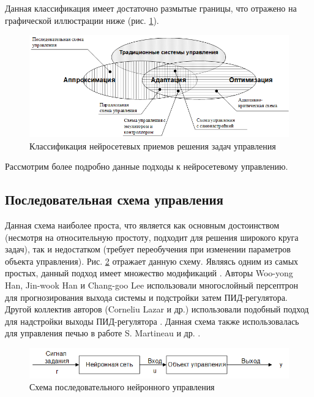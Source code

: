 Данная классификация имеет достаточно размытые границы, что отражено на графической иллюстрации ниже (рис. \ref{fig:neuro_control_classification}).

\begin{figure}[H]
    \centering
    \includegraphics[width=\textwidth]{images/chapter1/Классификация нейросетевых приемов решения задач управления.png}
    \caption{Классификация нейросетевых приемов решения задач управления}
    \label{fig:neuro_control_classification}
\end{figure}

Рассмотрим более подробно данные подходы к нейросетевому управлению.

\subsection{Последовательная схема управления}

Данная схема наиболее проста, что является как основным достоинством (несмотря на относительную простоту, подходит для решения широкого круга задач), так и недостатком (требует переобучения при изменении параметров объекта управления). Рис. \ref{fig:serial_neuro_control_scheme} отражает данную схему. Являясь одним из самых простых, данный подход имеет множество модификаций \cite{Ruano1992ApplicationsON}. Авторы Woo-yong Han, Jin-wook Han и Chang-goo Lee \cite{Han1999} использовали многослойный персептрон для прогнозирования выхода системы и подстройки затем ПИД-регулятора. Другой коллектив авторов (Corneliu Lazar и др.) использовали подобный подход для надстройки выходы ПИД-регулятора \cite{Lazar2004}. Данная схема также использовалась для управления печью в работе S. Martineau и др. \cite{Martineau2003}.

\begin{figure}[H]
    \centering
    \includegraphics[width=\textwidth]{images/chapter1/Схема последовательного нейронного управления.png}
    \caption{Схема последовательного нейронного управления}
    \label{fig:serial_neuro_control_scheme}
\end{figure}

